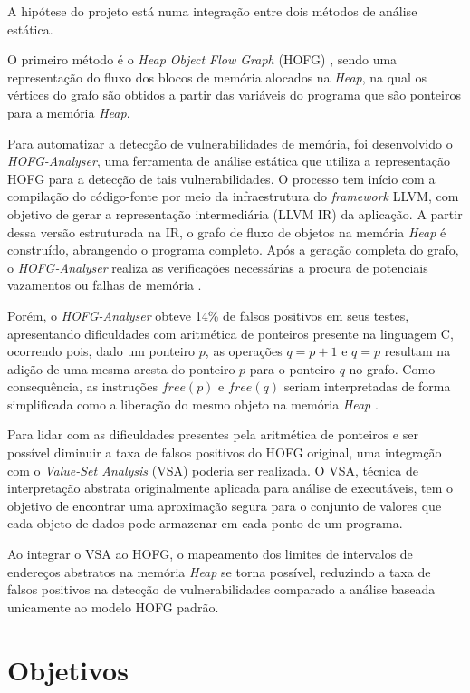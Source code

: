 \documentclass[
    12pt,                %
    openright,           %
    oneside,             %
    a4paper,             %
    english,             %
    brazil               %
]{abntex2}
\begin{document}
A hipótese do projeto está numa integração entre dois métodos de análise estática. 
\par
O primeiro método é o \textit{Heap Object Flow Graph} (HOFG) \cite{MadhavC2023}, sendo uma representação do fluxo dos blocos de memória alocados na \textit{Heap}, na qual os vértices do grafo são obtidos 
a partir das variáveis do programa que são ponteiros para a memória \textit{Heap}.
\par
Para automatizar a detecção de vulnerabilidades de memória, foi desenvolvido o \textit{HOFG-Analyser}, uma ferramenta de análise estática que utiliza a representação HOFG para a detecção de tais vulnerabilidades. 
O processo tem início com a compilação do código-fonte por meio da infraestrutura do \textit{framework} LLVM, com objetivo de gerar a representação intermediária (LLVM IR) da aplicação. A partir dessa versão estruturada na IR, 
o grafo de fluxo de objetos na memória \textit{Heap} é construído, abrangendo o programa completo. Após a geração completa do grafo, o \textit{HOFG-Analyser} realiza as verificações necessárias a procura de potenciais vazamentos ou falhas de memória \cite{MadhavC2023}.
\par 
Porém, o \textit{HOFG-Analyser} obteve 14\% de falsos positivos em seus testes, apresentando dificuldades com aritmética de ponteiros presente na linguagem C, ocorrendo pois, dado um ponteiro $p$, as operações $q = p + 1$ e $q = p$ resultam na adição de uma mesma aresta do 
ponteiro $p$ para o ponteiro $q$ no grafo. Como consequência, as instruções $free(p)$ e $free(q)$ seriam interpretadas de forma simplificada como a liberação do mesmo objeto na memória \textit{Heap} \cite{MadhavC2023}.
\par
Para lidar com as dificuldades presentes pela aritmética de ponteiros e ser possível diminuir a taxa de falsos positivos do HOFG original, 
uma integração com o \textit{Value-Set Analysis} (VSA) \cite{Balakrishnan2007} poderia ser realizada. O VSA, técnica de interpretação abstrata originalmente aplicada para análise de executáveis, 
tem o objetivo de encontrar uma aproximação segura para o conjunto de valores que cada objeto de dados pode armazenar em cada ponto de um programa. 
\par
Ao integrar o VSA ao HOFG, o mapeamento dos limites de intervalos de endereços abstratos na memória \textit{Heap} se torna possível, reduzindo a taxa de falsos positivos na detecção de vulnerabilidades comparado a análise baseada unicamente ao modelo HOFG padrão.


\section{Objetivos}
\label{sec:Objetivos}
\end{document}
